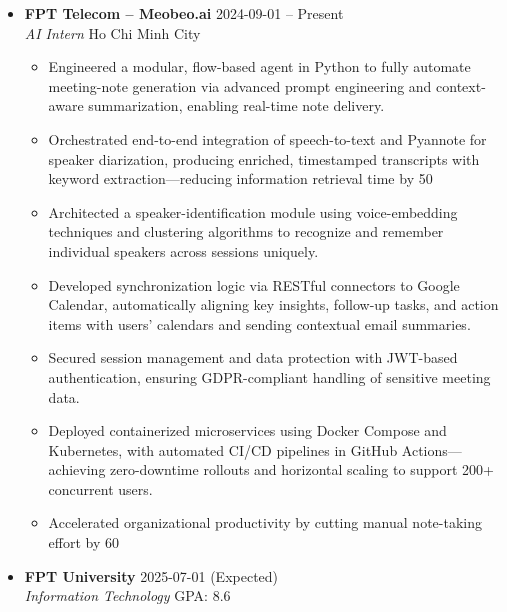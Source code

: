 \documentclass[a4paper,11pt]{article}
\newcommand{\sectiontitle}[1]{\vspace{0.5em}\noindent{\Large\color{primary}\textbf{#1}}\vspace{0.2em}}
\newcommand{\entry}[4]{
    \vspace{0.1em}
    \noindent\textbf{#1} \hfill #2\\
    \textit{#3} \hfill #4
    \vspace{0.1em}
}
\begin{document}
\sectiontitle{Experience}
\begin{itemize}[leftmargin=*, itemsep=0.2em]
    \item \entry{FPT Telecom – Meobeo.ai}{2024-09-01 – Present}{AI Intern}{Ho Chi Minh City}
        \begin{itemize}[leftmargin=1.5em, itemsep=0.1em]
            \item Engineered a modular, flow-based agent in Python to fully automate meeting-note generation via advanced prompt engineering and context-aware summarization, enabling real-time note delivery.
            \item Orchestrated end-to-end integration of speech-to-text and Pyannote for speaker diarization, producing enriched, timestamped transcripts with keyword extraction—reducing information retrieval time by 50%
            \item Architected a speaker-identification module using voice-embedding techniques and clustering algorithms to recognize and remember individual speakers across sessions uniquely.
            \item Developed synchronization logic via RESTful connectors to Google Calendar, automatically aligning key insights, follow-up tasks, and action items with users’ calendars and sending contextual email summaries.
            \item Secured session management and data protection with JWT-based authentication, ensuring GDPR-compliant handling of sensitive meeting data.
            \item Deployed containerized microservices using Docker Compose and Kubernetes, with automated CI/CD pipelines in GitHub Actions—achieving zero-downtime rollouts and horizontal scaling to support 200+ concurrent users.
            \item Accelerated organizational productivity by cutting manual note-taking effort by 60%
        \end{itemize}
\end{itemize}

\vspace{0.5em}

\sectiontitle{Education}
\begin{itemize}[leftmargin=*, itemsep=0.2em]
    \item \entry{FPT University}{2025-07-01 (Expected)}{Information Technology}{GPA: 8.6}
\end{itemize}
\end{document}
